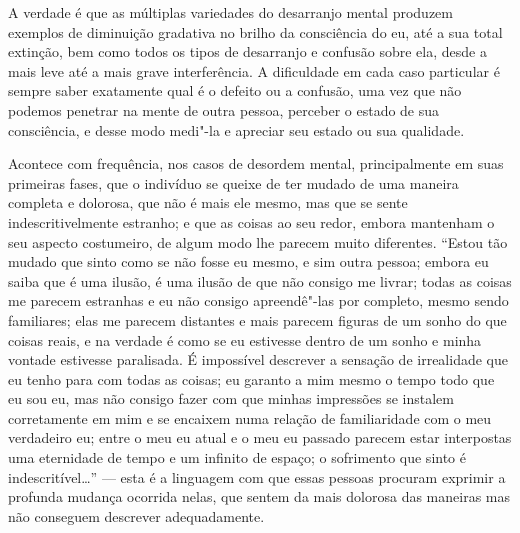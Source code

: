 A verdade é que as múltiplas variedades do desarranjo mental produzem
exemplos de diminuição gradativa no brilho da consciência do eu, até a
sua total extinção, bem como todos os tipos de desarranjo e confusão
sobre ela, desde a mais leve até a mais grave interferência.  A
dificuldade em cada caso particular é sempre saber exatamente qual é o
defeito ou a confusão, uma vez que não podemos penetrar na mente de
outra pessoa, perceber o estado de sua consciência, e desse modo
medi"-la e apreciar seu estado ou sua qualidade.

Acontece com frequência, nos casos de desordem mental, principalmente em
suas primeiras fases, que o indivíduo se queixe de ter mudado de uma
maneira completa e dolorosa, que não é mais ele mesmo, mas que se sente
indescritivelmente estranho; e que as coisas ao seu redor, embora
mantenham o seu aspecto costumeiro, de algum modo lhe parecem muito
diferentes.  “Estou tão mudado que sinto como se não fosse eu mesmo, e
sim outra pessoa; embora eu saiba que é uma ilusão, é uma ilusão de que
não consigo me livrar; todas as coisas me parecem estranhas e eu não
consigo apreendê"-las por completo, mesmo sendo familiares; elas
me parecem distantes e mais parecem figuras de um sonho do que coisas
reais, e na verdade é como se eu estivesse dentro de um sonho e minha
vontade estivesse paralisada.  É impossível descrever a sensação de
irrealidade que eu tenho para com todas as coisas; eu garanto a mim
mesmo o tempo todo que eu sou eu, mas não consigo fazer com que minhas
impressões se instalem corretamente em mim e se encaixem numa relação
de familiaridade com o meu verdadeiro eu; entre o meu eu atual e o meu
eu passado parecem estar interpostas uma eternidade de tempo e um
infinito de espaço; o sofrimento que sinto é indescritível\ldots{}” --- esta é
a linguagem com que essas pessoas procuram exprimir a profunda mudança
ocorrida nelas, que sentem da mais dolorosa das maneiras mas não
conseguem descrever adequadamente.


